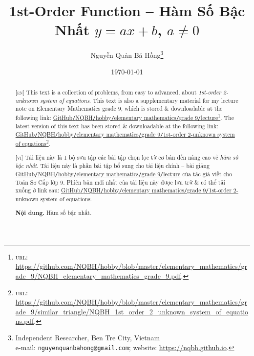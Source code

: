\documentclass{article}
\title{1st-Order Function -- Hàm Số Bậc Nhất $y = ax + b$, $a\ne0$}
\author{Nguyễn Quản Bá Hồng\footnote{Independent Researcher, Ben Tre City, Vietnam\\e-mail: \texttt{nguyenquanbahong@gmail.com}; website: \url{https://nqbh.github.io}.}}
\date{\today}
\begin{document}
\maketitle
\begin{abstract}
	\textsc{[en]} This text is a collection of problems, from easy to advanced, about \textit{1st-order 2-unknown system of equations}. This text is also a supplementary material for my lecture note on Elementary Mathematics grade 9, which is stored \& downloadable at the following link: \href{https://github.com/NQBH/hobby/blob/master/elementary_mathematics/grade_9/NQBH_elementary_mathematics_grade_9.pdf}{GitHub\texttt{/}NQBH\texttt{/}hobby\texttt{/}elementary mathematics\texttt{/}grade 9\texttt{/}lecture}\footnote{\textsc{url}: \url{https://github.com/NQBH/hobby/blob/master/elementary_mathematics/grade_9/NQBH_elementary_mathematics_grade_9.pdf}.}. The latest version of this text has been stored \& downloadable at the following link: \href{https://github.com/NQBH/hobby/blob/master/elementary_mathematics/grade_9/1st_order_2_unknown_system_of_equations/NQBH_1st_order_2_unknown_system_of_equations.pdf}{GitHub\texttt{/}NQBH\texttt{/}hobby\texttt{/}elementary mathematics\texttt{/}grade 9\texttt{/}1st-order 2-unknown system of equations}\footnote{\textsc{url}: \url{https://github.com/NQBH/hobby/blob/master/elementary_mathematics/grade_9/similar_triangle/NQBH_1st_order_2_unknown_system_of_equations.pdf}.}.
	\vspace{2mm}
	
	\textsc{[vi]} Tài liệu này là 1 bộ sưu tập các bài tập chọn lọc từ cơ bản đến nâng cao về \textit{hàm số bậc nhất}. Tài liệu này là phần bài tập bổ sung cho tài liệu chính -- bài giảng \href{https://github.com/NQBH/hobby/blob/master/elementary_mathematics/grade_9/NQBH_elementary_mathematics_grade_9.pdf}{GitHub\texttt{/}NQBH\texttt{/}hobby\texttt{/}elementary mathematics\texttt{/}grade 9\texttt{/}lecture} của tác giả viết cho Toán Sơ Cấp lớp 9. Phiên bản mới nhất của tài liệu này được lưu trữ \& có thể tải xuống ở link sau: \href{https://github.com/NQBH/hobby/blob/master/elementary_mathematics/grade_9/1st_order_2_unknown_system_of_equations/NQBH_1st_order_2_unknown_system_of_equations.pdf}{GitHub\texttt{/}NQBH\texttt{/}hobby\texttt{/}elementary mathematics\texttt{/}grade 9\texttt{/}1st-order 2-unknown system of equations}.
	
	\textsf{\textbf{Nội dung.} Hàm số bậc nhất.}
\end{abstract}
\tableofcontents
\newpage

\end{document}

